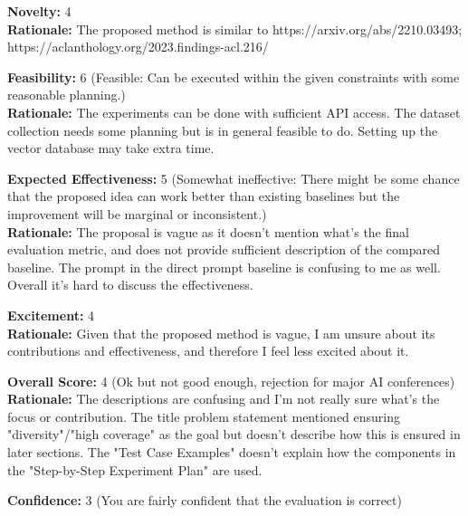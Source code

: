 \newpage


\begin{tcolorbox}[colback=green!10!white, colframe=green!80!black, title=\textbf{Reviewer 1}]
\small
\textbf{Novelty:} 4\\
\textbf{Rationale:} The proposed method is similar to https://arxiv.org/abs/2210.03493; \\
https://aclanthology.org/2023.findings-acl.216/

\vspace{10pt}

\textbf{Feasibility:} 6 (Feasible: Can be executed within the given constraints with some reasonable planning.)\\
\textbf{Rationale:} The experiments can be done with sufficient API access. The dataset collection needs some planning but is in general feasible to do. Setting up the vector database may take extra time.

\vspace{10pt}

\textbf{Expected Effectiveness:} 5 (Somewhat ineffective: There might be some chance that the proposed idea can work better than existing baselines but the improvement will be marginal or inconsistent.)\\
\textbf{Rationale:} The proposal is vague as it doesn't mention what's the final evaluation metric, and does not provide sufficient description of the compared baseline. The prompt in the direct prompt baseline is confusing to me as well. Overall it's hard to discuss the effectiveness.

\vspace{10pt}

\textbf{Excitement:} 4\\
\textbf{Rationale:} Given that the proposed method is vague, I am unsure about its contributions and effectiveness, and therefore I feel less excited about it.

\vspace{10pt}

\textbf{Overall Score:} 4 (Ok but not good enough, rejection for major AI conferences)\\
\textbf{Rationale:} The descriptions are confusing and I'm not really sure what's the focus or contribution. The title problem statement mentioned ensuring "diversity"/"high coverage" as the goal but doesn't describe how this is ensured in later sections. The "Test Case Examples" doesn't explain how the components in the "Step-by-Step Experiment Plan" are used.

\vspace{10pt}

\textbf{Confidence:} 3 (You are fairly confident that the evaluation is correct)
\end{tcolorbox}

